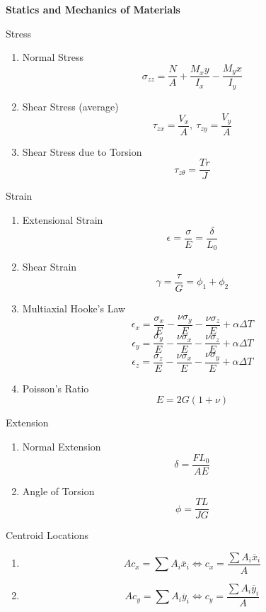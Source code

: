 \begin{multicols*}{2}[]
\textbf{Statics and Mechanics of Materials}

\vspace{-0.5em}
Stress
\vspace{-0.5em}
\begin{enumerate}
        \item[] Normal Stress \[\sigma_{zz} = \frac{N}{A} + \frac{M_xy}{I_x} - \frac{M_yx}{I_y}\]
        \item[] Shear Stress (average) \[\tau_{zx} = \frac{V_x}{A},\ \tau_{zy} = \frac{V_y}{A}\]
        \item[] Shear Stress due to Torsion \[\tau_{z\theta} = \frac{Tr}{J}\]
\end{enumerate}
\vspace{-0.5em}
Strain
\vspace{-0.5em}
\begin{enumerate}
    \item[] Extensional Strain \[\epsilon = \frac{\sigma}{E} = \frac{\delta}{L_0} \]
    \item[] Shear Strain \[\gamma = \frac{\tau}{G} = \phi_1 + \phi_2\]
    \item[] Multiaxial Hooke's Law 
        \[\epsilon_x = \frac{\sigma_x}{E} - \frac{\nu\sigma_y}{E} - \frac{\nu \sigma_z}{E} + \alpha\Delta T\]
        \[\epsilon_y = \frac{\sigma_y}{E} - \frac{\nu\sigma_x}{E} - \frac{\nu \sigma_z}{E} + \alpha\Delta T\]
        \[\epsilon_z = \frac{\sigma_z}{E} - \frac{\nu\sigma_x}{E} - \frac{\nu \sigma_y}{E} + \alpha\Delta T\]
    \item[] Poisson's Ratio \[E = 2G(1+\nu)\]
\end{enumerate}
\vspace{0.5em}
Extension
\vspace{-0.5em}
\begin{enumerate}
    \item[] Normal Extension \[\delta = \frac{FL_0}{AE}\]
    \item[] Angle of Torsion \[\phi = \frac{TL}{JG}\]
\end{enumerate}
\vspace{-0.5em}
Centroid Locations
\vspace{-1em}
\begin{enumerate}
    \item[] \[A c_x = \sum A_i\overline{x}_i \iff c_x = \frac{\sum A_i\overline{x}_i}{A}\]
    \item[] \[A c_y = \sum A_i\overline{y}_i \iff c_y = \frac{\sum A_i\overline{y}_i}{A}\]

\end{enumerate}
\end{multicols*}
